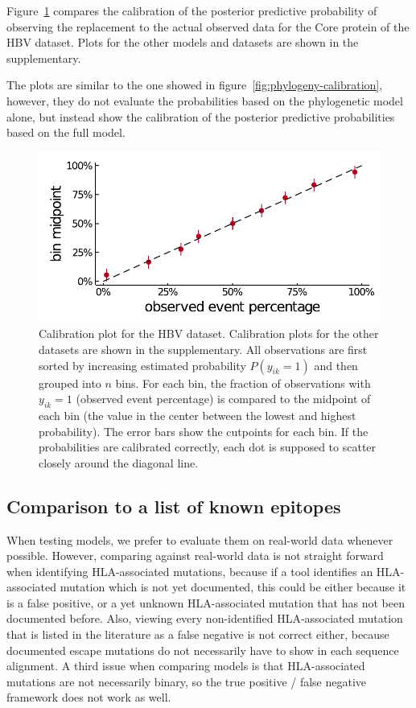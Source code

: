 \documentclass{bioinfo}
\begin{document}
Figure~\ref{fig:calibration} compares the calibration of the posterior predictive probability of observing the replacement to the actual observed data for the Core protein of the HBV dataset. Plots for the other models and datasets are shown in the supplementary.

The plots are similar to the one showed in figure~\ref{fig:phylogeny-calibration}, however, they do not evaluate the probabilities based on the phylogenetic model alone, but instead show the calibration of the posterior predictive probabilities based on the full model.

\begin{figure}[!ht]
  \includegraphics[width=1\linewidth]{plots/phylogeny_calibration.pdf}
  \caption{Calibration plot for the HBV dataset. Calibration plots for the other datasets are shown in the supplementary.
  All observations are first sorted by increasing estimated probability \(P(y_{ik}=1)\) and then grouped into \(n\) bins.
  For each bin, the fraction of observations with \(y_{ik}=1\) (observed event percentage) is compared to the midpoint of each bin (the value in the center between the lowest and highest probability). The error bars show the cutpoints for each bin. If the probabilities are calibrated correctly, each dot is supposed to scatter closely around the diagonal line.}
  \label{fig:calibration}
\end{figure}

\subsection*{Comparison to a list of known epitopes}

When testing models, we prefer to evaluate them on real-world data whenever possible. 
However, comparing against real-world data is not straight forward when identifying HLA-associated mutations, because if a tool identifies an HLA-associated mutation which is not yet documented, this could be either because it is a false positive, or a yet unknown HLA-associated mutation that has not been documented before. 
Also, viewing every non-identified HLA-associated mutation that is listed in the literature as a false negative is not correct either, because documented escape mutations do not necessarily have to show in each sequence alignment.
A third issue when comparing models is that HLA-associated mutations are not necessarily binary, so the true positive / false negative framework does not work as well.
\end{document}
